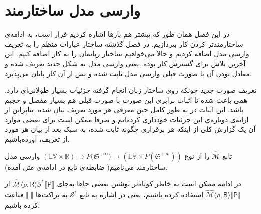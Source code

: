 \chapter{وارسی مدل ساختارمند}

در این فصل همان طور که پیشتر هم بارها اشاره کردیم قرار است، به ادامه‌ی ساختارمندتر کردن کار بپردازیم. در فصل گذشته ساختار عبارات منظم را به تعریف وارسی مدل اضافه کردیم و حالا می‌خواهیم ساختار زبانمان را به کار اضافه کنیم. این آخرین تلاش \cite{calcul} برای گسترش کار بوده. یعنی وارسی مدل به شکل جدید تعریف شده و معادل بودن آن با صورت قبلی وارسی مدل ثابت شده و پس از آن کار پایان می‌پذیرد. 

تعریف صورت جدید چونکه روی ساختار زبان انجام گرفته جزئیات بسیار طولانی‌ای دارد. همی باعث شده تا اثبات‌ برابری این صورت با صورت قبلی هم بسیار مفصل و حجیم باشد. این اثبات در \cite{calcul} به طور کامل حین معرفی هر مورد تعریف بیان شده. بنابراین از ارائه‌ی دوباره‌ی این جزئیات خودداری کرده‌ایم و صرفا ممکن است برای بعضی موارد آن یک گزارش کلی از اینکه هر برقراری چگونه ثابت شده، به سبک \cite{calcul} بعد از بیان هر مورد از تعریف، آورده‌باشیم.

\begin{defn}
	
تابع
$\mathcal{\hat{M}}$
 را از نوع
 $\mathbb{(\underline{EV} \times R)} \rightarrow  \mathit{P}({\mathfrak{S}^{+\infty})}
\rightarrow ( \mathbb{\underline{EV}} \times \mathit{P}(\mathfrak{S}^{+\infty})) $
وارسی مدل ساختارمند می‌نامیم( ضابطه‌ی تابع در ادامه‌ی متن آمده).
\end{defn}
در ادامه ممکن است به خاطر کوتاه‌تر نوشتن بعضی جاها به‌جای 
$\mathcal{\hat{M}}\langle \underline{\rho}, \mathsf{R} \rangle \mathcal{S}^* \llbracket \mathsf{P} \rrbracket$
از 
$\mathcal{\hat{M}}\langle \underline{\rho}, \mathsf{R} \rangle \llbracket \mathsf{P} \rrbracket$
استفاده کرده باشیم، یعنی در اشاره به تابع $\mathcal{S}^*$ به براکت‌ها
$\llbracket \; \rrbracket$
قناعت کرده باشیم.



